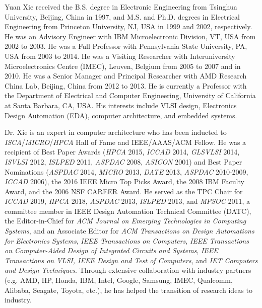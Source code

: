 \documentclass[10pt,journal,compsoc]{IEEEtran}
\begin{document}
\begin{IEEEbiography}{Yuan Xie} received the B.S. degree in Electronic Engineering from Tsinghua University, Beijing, China in 1997, and M.S. and Ph.D. degrees in Electrical Engineering from Princeton University, NJ, USA in 1999 and 2002, respectively. He was an Advisory Engineer with IBM Microelectronic Division, VT, USA from 2002 to 2003. He was a Full Professor with Pennsylvania State University, PA, USA from 2003 to 2014. He was a Visiting Researcher with Interuniversity Microelectronics Centre (IMEC), Leuven, Belgium from 2005 to 2007 and in 2010. He was a Senior Manager and Principal Researcher with AMD Research China Lab, Beijing, China from 2012 to 2013. He is currently a Professor with the Department of Electrical and Computer Engineering, University of California at Santa Barbara, CA, USA. His interests include VLSI design, Electronics Design Automation (EDA), computer architecture, and embedded systems. 

Dr. Xie is an expert in computer architecture who has been inducted to \emph{ISCA}/\emph{MICRO}/\emph{HPCA} Hall of Fame and IEEE/AAAS/ACM Fellow. He was a recipient of Best Paper Awards (\emph{HPCA} 2015, \emph{ICCAD} 2014, \emph{GLSVLSI} 2014, \emph{ISVLSI} 2012, \emph{ISLPED} 2011, \emph{ASPDAC} 2008, \emph{ASICON} 2001) and Best Paper Nominations (\emph{ASPDAC} 2014, \emph{MICRO} 2013, \emph{DATE} 2013, \emph{ASPDAC} 2010-2009, \emph{ICCAD} 2006), the 2016 IEEE Micro Top Picks Award, the 2008 IBM Faculty Award, and the 2006 NSF CAREER Award. He served as the TPC Chair for \emph{ICCAD} 2019, \emph{HPCA} 2018, \emph{ASPDAC} 2013, \emph{ISLPED} 2013, and \emph{MPSOC} 2011, a committee member in IEEE Design Automation Technical Committee (DATC), the Editor-in-Chief for \emph{ACM Journal on Emerging Technologies in Computing Systems}, and an Associate Editor for \emph{ACM Transactions on Design Automations for Electronics Systems}, \emph{IEEE Transactions on Computers}, \emph{IEEE Transactions on Computer-Aided Design of Integrated Circuits and Systems}, \emph{IEEE Transactions on VLSI, IEEE Design and Test of Computers}, and \emph{IET Computers and Design Techniques}. Through extensive collaboration with industry partners (e.g. AMD, HP, Honda, IBM, Intel, Google, Samsung, IMEC, Qualcomm, Alibaba, Seagate, Toyota, etc.), he has helped the transition of research ideas to industry. 
\end{IEEEbiography} 
\end{document}
